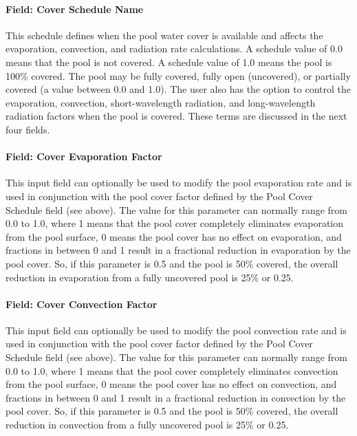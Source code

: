 \paragraph{Field: Cover Schedule Name}\label{field-cover-schedule-name}

This schedule defines when the pool water cover is available and affects the evaporation, convection, and radiation rate calculations. A schedule value of 0.0 means that the pool is not covered. A schedule value of 1.0 means the pool is 100\% covered. The pool may be fully covered, fully open (uncovered), or partially covered (a value between 0.0 and 1.0). The user also has the option to control the evaporation, convection, short-wavelength radiation, and long-wavelength radiation factors when the pool is covered. These terms are discussed in the next four fields.

\paragraph{Field: Cover Evaporation Factor}\label{field-cover-evaporation-factor}

This input field can optionally be used to modify the pool evaporation rate and is used in conjunction with the pool cover factor defined by the Pool Cover Schedule field (see above). The value for this parameter can normally range from 0.0 to 1.0, where 1 means that the pool cover completely eliminates evaporation from the pool surface, 0 means the pool cover has no effect on evaporation, and fractions in between 0 and 1 result in a fractional reduction in evaporation by the pool cover. So, if this parameter is 0.5 and the pool is 50\% covered, the overall reduction in evaporation from a fully uncovered pool is 25\% or 0.25.

\paragraph{Field: Cover Convection Factor}\label{field-cover-convection-factor}

This input field can optionally be used to modify the pool convection rate and is used in conjunction with the pool cover factor defined by the Pool Cover Schedule field (see above). The value for this parameter can normally range from 0.0 to 1.0, where 1 means that the pool cover completely eliminates convection from the pool surface, 0 means the pool cover has no effect on convection, and fractions in between 0 and 1 result in a fractional reduction in convection by the pool cover. So, if this parameter is 0.5 and the pool is 50\% covered, the overall reduction in convection from a fully uncovered pool is 25\% or 0.25.

